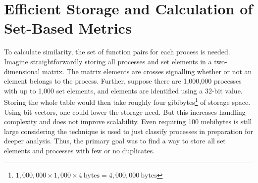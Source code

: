 \documentclass[a4paper, final, diplominf]{zih-template}
\begin{document}
\vspace{1.5ex}
\section{Efficient Storage and Calculation of Set-Based Metrics}
\label{sec:new-storage}
\vspace{1.5ex}
To calculate similarity, the set of function pairs for each process is needed.
Imagine straightforwardly storing all processes and set elements in a two-dimensional matrix.
The matrix elements are crosses signalling whether or not an element belongs to the process.
Further, suppose there are 1,000,000 processes with up to 1,000 set elements, and elements are identified using a 32-bit value.
Storing the whole table would then take roughly four gibibytes\footnote{$1,000,000 \times 1,000 \times 4 ~\text{bytes} = 4,000,000 ~\text{bytes}$} of storage space.
Using bit vectors, one could lower the storage need.
But this increases handling complexity and does not improve scalability.
Even requiring 100 mebibytes is still large considering the technique is used to just classify processes in preparation for deeper analysis.
Thus, the primary goal was to find a way to store all set elements and processes with few or no duplicates.
\end{document}
